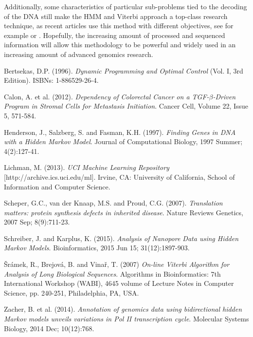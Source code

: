 \documentclass[a4paper, 11pt]{article} %
\begin{document}
Additionally, some characteristics of particular sub-problems tied to the decoding of the DNA still make the HMM and Viterbi approach a top-class research technique, as recent articles use this method with different objectives, see for example \cite{schreiber} or \cite{sacher}. Hopefully, the increasing amount of processed and sequenced information will allow this methodology to be powerful and widely used in an increasing amount of advanced genomics research.


\medskip


\begin{thebibliography}{9}

Bertsekas, D.P. (1996).
\textit{Dynamic Programming and Optimal Control} (Vol. I, 3rd Edition). ISBNs: 1-886529-26-4.

Calon, A. et al. (2012).
\textit{Dependency of Colorectal Cancer on a TGF-$\beta$-Driven Program in Stromal Cells for Metastasis Initiation}.
Cancer Cell, Volume 22, Issue 5, 571-584.

Henderson, J., Salzberg, S. and Fasman, K.H. (1997).
\textit{Finding Genes in DNA with a Hidden Markov Model}.
Journal of Computational Biology, 1997 Summer; 4(2):127-41.

Lichman, M. (2013).
\textit{UCI Machine Learning Repository} [http://archive.ics.uci.edu/ml]. Irvine, CA: University of California, School of Information and Computer Science.

Scheper, G.C., van der Knaap, M.S. and Proud, C.G. (2007).
\textit{Translation matters: protein synthesis defects in inherited disease}.
Nature Reviews Genetics, 2007 Sep; 8(9):711-23.

Schreiber, J. and Karplus, K. (2015).
\textit{Analysis of Nanopore Data using Hidden Markov Models}.
Bioinformatics, 2015 Jun 15; 31(12):1897-903.

\v{S}r\'amek, R., Brejov\'a, B. and Vina\v{r}, T. (2007)
\textit{On-line Viterbi Algorithm for Analysis of Long Biological Sequences}.
Algorithms in Bioinformatics: 7th International Workshop (WABI), 4645 volume of Lecture Notes in Computer Science, pp. 240-251, Philadelphia, PA, USA.

Zacher, B. et al. (2014).
\textit{Annotation of genomics data using bidirectional hidden Markov models unveils variations in Pol II transcription cycle}.
Molecular Systems Biology, 2014 Dec; 10(12):768. 

\end{thebibliography}
\end{document}
